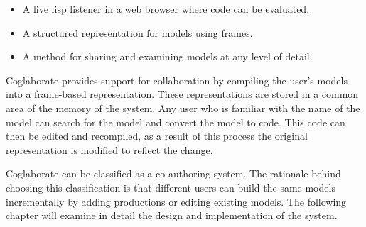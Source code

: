 

\begin{itemize}
\item A live lisp listener in a web browser where code can be evaluated.
\item A structured representation for models using frames.
\item A method for sharing and examining models at any level of
  detail.
\end{itemize}

Coglaborate provides support for collaboration by compiling the user's
models into a frame-based representation. These representations are
stored in a common area of the memory of the system. Any user who is
familiar with the name of the model can search for the model and
convert the model to code. This code can then be edited and
recompiled, as a result of this process the original representation is
modified to reflect the change.

Coglaborate can be classified as a co-authoring system. The rationale
behind choosing this classification is that different users can build
the same models incrementally by adding productions or editing
existing models. The following chapter will examine in detail the
design and implementation of the system.

